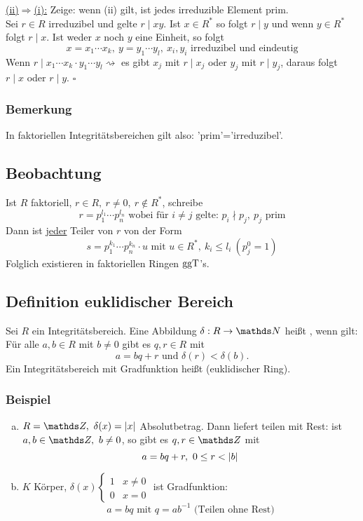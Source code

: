 \uline{(ii)$\Rightarrow$(i):}
Zeige: wenn (ii) gilt, ist jedes irreduzible Element prim.\\
Sei $r\in R$ irreduzibel und gelte $r\mid xy$.
Ist $x\in R^*$ so folgt $r\mid y$ und wenn $y\in R^*$ folgt $r\mid x$.
Ist weder $x$ noch $y$ eine Einheit, so folgt
\[
x=x_1\cdots x_k,~ y=y_1\cdots y_l,~x_i,y_i\text{ irreduzibel und eindeutig}
\]
Wenn $r\mid x_1\cdots x_k\cdot y_1\cdots y_l\rightsquigarrow$ es gibt $x_j$ mit $r\mid x_j$ oder $y_j$ mit $r\mid y_j$, daraus folgt $r\mid x$ oder $r\mid y$.
\hfill $\square$

\subsubsection*{Bemerkung}
In faktoriellen Integritätsbereichen gilt also: 'prim'='irreduzibel'.

\subsection{Beobachtung}
\label{sub:beobachtung}
Ist $R$ faktoriell, $r\in R,~r\neq 0,~r\notin R^*$, schreibe
\[
r=p_1^{l_1}\cdots p_n^{l_n} \text{ wobei für }i\neq j\text{ gelte: }p_i\nmid p_j,~p_j\text{ prim}
\]
Dann ist \uline{jeder} Teiler von $r$ von der Form
\[
s=p_1^{k_1}\cdots p_n^{k_n}\cdot u \text{ mit } u\in R^*,~k_i\le l_i~(p_j^0=1)
\]
Folglich existieren in faktoriellen Ringen $\operatorname{ggT}$'s.

\subsection{Definition euklidischer Bereich}
\label{sub:def_euklid_bereich}
Sei $R$ ein Integritätsbereich.
Eine Abbildung $\delta:R\to\N$ heißt , wenn gilt:
Für alle $a,b\in R$ mit $b\neq 0$ gibt es $q,r\in R$ mit
\[
a=bq+r \text{ und } \delta(r)<\delta(b).
\]
Ein Integritätsbereich mit Gradfunktion heißt  (euklidischer Ring).

\subsubsection*{Beispiel}
\begin{enumerate}[(a)]
	\item $R=\Z,~\delta(x)=\abs{x}$ Absolutbetrag.
	Dann liefert teilen mit Rest: ist $a,b\in\Z,~b\neq 0$, so gibt es $q,r\in\Z$ mit
	\[
	a=bq+r,~0\le r<\left\vert b\right\vert
	\]
	\item $K$ Körper, $\delta(x)\left\{\begin{array}{cl}1 & x\neq 0\\ 0 & x=0 \end{array}\right.$ ist Gradfunktion:
	\[
	a=bq \text{ mit } q=ab^{-1} \text{ (Teilen ohne Rest)}
	\]
\end{enumerate}

